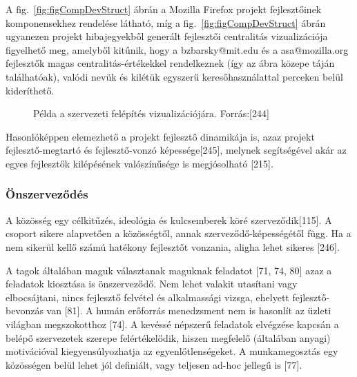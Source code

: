\documentclass[12pt,magyar,a4paper,oneside]{scrreprt}
\begin{document}
A fig.~\ref{fig:figCompDevStruct} ábrán a Mozilla Firefox projekt
fejlesztőinek komponensekhez rendelése látható, míg a
fig.~\ref{fig:figCompDevStruct} ábrán ugyanezen projekt hibajegyekből
generált fejlesztői centralitás vizualizációja figyelhető meg, amelyből
kitűnik, hogy a bzbarsky@mit.edu és a asa@mozilla.org fejlesztők magas
centralitás-értékekkel rendelkeznek (így az ábra közepe táján
találhatóak), valódi nevük és kilétük egyszerű keresőhasználattal
perceken belül kideríthető.

\begin{figure}
\centering


\caption{Példa a szervezeti felépítés vizualizációjára.
Forrás:{[}244{]}}

\label{fig:OSSD_struct}

\end{figure}

Hasonlóképpen elemezhető a projekt fejlesztő dinamikája is, azaz projekt
fejlesztő-megtartó és fejlesztő-vonzó képessége{[}245{]}, melynek
segítségével akár az egyes fejlesztők kilépésének valószínűsége is
megjósolható {[}215{]}.

\hypertarget{uxf6nszervezux151duxe9s}{%
\subsubsection{Önszerveződés}\label{uxf6nszervezux151duxe9s}}

A közösség egy célkitűzés, ideológia és kulcsemberek köré
szerveződik{[}115{]}. A csoport sikere alapvetően a közösségtől, annak
szerveződő-képességétől függ. Ha a nem sikerül kellő számú hatékony
fejlesztőt vonzania, aligha lehet sikeres {[}246{]}.

A tagok általában maguk választanak maguknak feladatot {[}71, 74, 80{]}
azaz a feladatok kiosztása is önszerveződő. Nem lehet valakit utasítani
vagy elbocsájtani, nincs fejlesztő felvétel és alkalmassági vizsga,
ehelyett fejlesztő-bevonzás van {[}81{]}. A humán erőforrás menedzsment
nem is hasonlít az üzleti világban megszokotthoz {[}74{]}. A kevéssé
népszerű feladatok elvégzése kapcsán a belépő szervezetek szerepe
felértékelődik, hiszen megfelelő (általában anyagi) motivációval
kiegyensúlyozhatja az egyenlőtlenségeket. A munkamegosztás egy
közösségen belül lehet jól definiált, vagy teljesen ad-hoc jellegű is
{[}77{]}.
\end{document}
